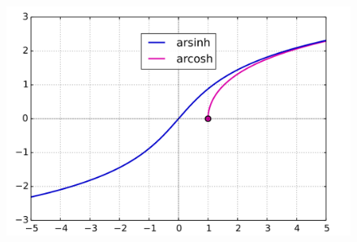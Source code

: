 \begin{figure}[!htb]
\begin{minipage}{.5\textwidth}
		\includegraphics[width=1\linewidth]{images/arsinharcosh.png}
	\end{minipage}
\end{figure}

